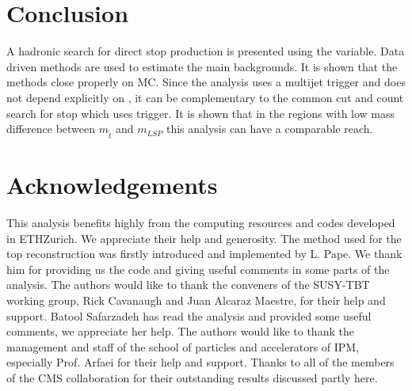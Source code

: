 \section{Conclusion}
\label{sect:conclusion}
A hadronic search for direct stop production is presented using the \mttwo variable. Data driven methods are used to estimate the main
backgrounds. It is shown that the methods close properly on MC. Since the analysis uses a multijet trigger and \mttwo does not 
depend explicitly on \met, it can be complementary to the common cut and count search for stop which uses \met trigger. 
It is shown that in the regions with low mass difference between $m_{\tilde{t}}$ and 
$m_{LSP}$ this analysis can have a comparable reach. 


\section{Acknowledgements}
This analysis benefits highly from the computing resources and codes developed in ETHZurich. 
We appreciate their help and generosity. The method used for the top reconstruction was firstly introduced and implemented by L. Pape. 
We thank him for providing us the code and giving useful comments in some parts of the analysis.
The authors would like to thank the conveners of the SUSY-TBT working group, Rick Cavanaugh 
and Juan Alcaraz Maestre, for their help and support. Batool Safarzadeh has read the analysis and provided some useful comments, we appreciate
her help.
The authors would like to thank the management and staff of the school of particles 
and accelerators of IPM, especially Prof. Arfaei for their help and support. Thanks to all of the members of
the CMS collaboration for their outstanding results discussed partly here.
